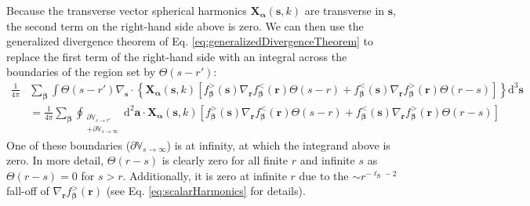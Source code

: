 Because the transverse vector spherical harmonics $\mathbf{X}_{\bm{\alpha}}(\mathbf{s},k)$ are transverse in $\mathbf{s}$, the second term on the right-hand side above is zero. We can then use the generalized divergence theorem of Eq. \eqref{eq:generalizedDivergenceTheorem} to replace the first term of the right-hand side with an integral across the boundaries of the region set by $\Theta(s - r')$:
\begin{equation}
\begin{split}
\frac{1}{4\pi}&\sum_{\bm{\beta}}\int\Theta(s - r')\nabla_{\mathbf{s}}\cdot\left\{\mathbf{X}_{\bm{\alpha}}(\mathbf{s},k)\left[f_{\bm{\beta}}^>(\mathbf{s})\nabla_{\mathbf{r}}f_{\bm{\beta}}^<(\mathbf{r})\Theta(s - r) + f_{\bm{\beta}}^<(\mathbf{s})\nabla_{\mathbf{r}}f_{\bm{\beta}}^>(\mathbf{r})\Theta(r - s)\right]\right\}\mathrm{d}^3\mathbf{s}\\
&= \frac{1}{4\pi}\sum_{\bm{\beta}}\oint_{\substack{\partial\mathbb{V}_{s\to r'}\\ + \partial\mathbb{V}_{s\to\infty}}}\mathrm{d}^2\mathbf{a}\cdot\mathbf{X}_{\bm{\alpha}}(\mathbf{s},k)\left[f_{\bm{\beta}}^>(\mathbf{s})\nabla_{\mathbf{r}}f_{\bm{\beta}}^<(\mathbf{r})\Theta(s - r) + f_{\bm{\beta}}^<(\mathbf{s})\nabla_{\mathbf{r}}f_{\bm{\beta}}^>(\mathbf{r})\Theta(r - s)\right]
\end{split}
\end{equation}
One of these boundaries ($\partial\mathbb{V}_{s\to\infty}$) is at infinity, at which the integrand above is zero. In more detail, $\Theta(r - s)$ is clearly zero for all finite $r$ and infinite $s$ as $\Theta(r - s) = 0$ for $s > r$. Additionally, it is zero at infinite $r$ due to the $\sim r^{-\ell_{\bm{\beta}} - 2}$ fall-off of $\nabla_{\mathbf{r}}f_{\bm{\beta}}^>(\mathbf{r})$ (see Eq. \eqref{eq:scalarHarmonics} for details). 

